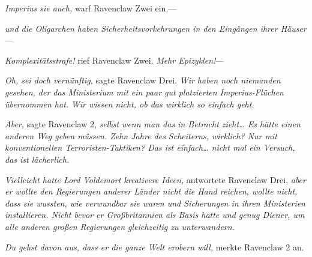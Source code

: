 \emph{Imperius sie auch,} warf Ravenclaw Zwei ein.—

\emph{und die Oligarchen haben Sicherheitsvorkehrungen in den Eingängen ihrer Häuser}—

\emph{Komplexitätsstrafe!} rief Ravenclaw Zwei. \emph{Mehr Epizyklen!}—

\emph{Oh, sei doch vernünftig,} sagte Ravenclaw Drei. \emph{Wir haben noch niemanden gesehen, der das Ministerium mit ein paar gut platzierten Imperius-Flüchen übernommen hat.} \emph{Wir wissen nicht, ob das wirklich so einfach geht.}

\emph{Aber,} sagte Ravenclaw 2, \emph{selbst wenn man das in Betracht zieht… Es hätte einen anderen Weg geben müssen. Zehn Jahre des Scheiterns, wirklich? Nur mit konventionellen Terroristen-Taktiken? Das ist einfach… nicht mal ein Versuch, das ist lächerlich.}

\emph{Vielleicht hatte Lord Voldemort kreativere Ideen,} antwortete Ravenclaw Drei, \emph{aber er wollte den Regierungen anderer Länder nicht die Hand reichen, wollte nicht, dass sie wussten, wie verwundbar sie waren und Sicherungen in ihren Ministerien installieren. Nicht bevor er Großbritannien als Basis hatte und genug Diener, um alle anderen großen Regierungen gleichzeitig zu unterwandern.}

\emph{Du gehst davon aus, dass er die ganze Welt erobern will,} merkte Ravenclaw 2 an.

